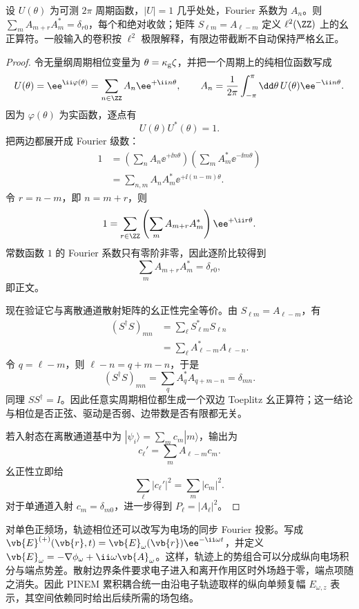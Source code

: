 \begin{theorem}
设 $U(\theta)$ 为可测 $2\pi$ 周期函数，$|U|=1$ 几乎处处，Fourier 系数为 $A_n$。则 $\sum_m A_{m+r}A_m^*=\delta_{r0}$，每个和绝对收敛；矩阵 $S_{\ell m}=A_{\ell-m}$ 定义 $\ell^2(\ZZ)$ 上的幺正算符。一般输入的卷积按 $\ell^2$ 极限解释，有限边带截断不自动保持严格幺正。
\end{theorem}
\begin{proof}
令无量纲周期相位变量为 $\theta=\kappa_{\rm g}\zeta$，并把一个周期上的纯相位函数写成
\[
U(\theta)=\ee^{\ii\varphi(\theta)}
=\sum_{n\in\ZZ}A_n\ee^{+\ii n\theta},
\qquad
A_n=\frac1{2\pi}\int_{-\pi}^{\pi}\dd\theta\,
U(\theta)\ee^{-\ii n\theta}.
\]
因为 $\varphi(\theta)$ 为实函数，逐点有
\[
U(\theta)U^*(\theta)=1.
\]
把两边都展开成 Fourier 级数：
\begin{align*}
1
&=\left(\sum_nA_n\ee^{+\ii n\theta}\right)
  \left(\sum_mA_m^*\ee^{-\ii m\theta}\right)\\
&=\sum_{n,m}A_nA_m^*\ee^{+\ii(n-m)\theta}.
\end{align*}
令 $r=n-m$，即 $n=m+r$，则
\[
1
=\sum_{r\in\ZZ}
\left(\sum_mA_{m+r}A_m^*\right)
\ee^{+\ii r\theta}.
\]
常数函数 $1$ 的 Fourier 系数只有零阶非零，因此逐阶比较得到
\[
\sum_mA_{m+r}A_m^*=\delta_{r0},
\]
即正文。

现在验证它与离散通道散射矩阵的幺正性完全等价。由
$S_{\ell m}=A_{\ell-m}$，有
\begin{align*}
(S^\dagger S)_{mn}
&=\sum_\ell S_{\ell m}^*S_{\ell n}\\
&=\sum_\ell A_{\ell-m}^*A_{\ell-n}.
\end{align*}
令 $q=\ell-m$，则 $\ell-n=q+m-n$，于是
\[
(S^\dagger S)_{mn}
=\sum_q A_q^*A_{q+m-n}
=\delta_{mn}.
\]
同理 $SS^\dagger=I$。因此任意实周期相位都生成一个双边 Toeplitz 幺正算符；这一结论与相位是否正弦、驱动是否弱、边带数是否有限都无关。

若入射态在离散通道基中为 $|\psi_i\rangle=\sum_m c_m|m\rangle$，输出为
\[
c_\ell'=
\sum_mA_{\ell-m}c_m.
\]
幺正性立即给
\[
\sum_\ell|c_\ell'|^2
=\sum_m|c_m|^2.
\]
对于单通道入射 $c_m=\delta_{m0}$，进一步得到 $P_\ell=|A_\ell|^2$。
\end{proof}


对单色正频场，轨迹相位还可以改写为电场的同步 Fourier 投影。写成
$\vb{E}^{(+)}(\vb{r},t)=\vb{E}_\omega(\vb{r})\ee^{-\ii\omega t}$，并定义
$\vb{E}_\omega=-\nabla\phi_\omega+\ii\omega\vb{A}_\omega$。这样，轨迹上的势组合可以分成纵向电场积分与端点势差。散射边界条件要求电子进入和离开作用区时外场趋于零，端点项随之消失。因此 PINEM 累积耦合统一由沿电子轨迹取样的纵向单频复幅 $E_{\omega,z}$ 表示，其空间依赖同时给出后续所需的场包络。

